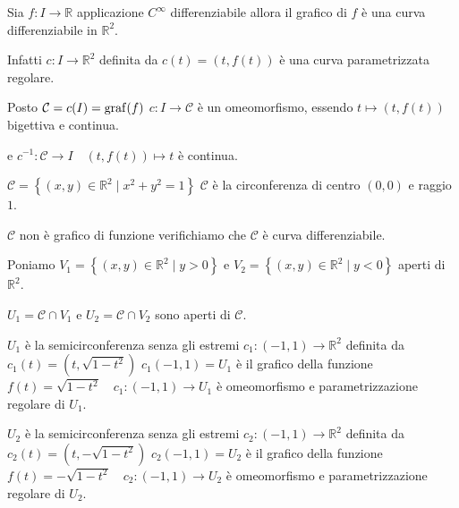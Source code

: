         \begin{esempio}
        Sia $f : I \to \mathbb{R}$ applicazione $C^\infty$ differenziabile allora il grafico di $f$ è una curva differenziabile in $\mathbb{R}^2$.

        Infatti $c:I \to \mathbb{R}^2$ definita da $c(t) = (t, f(t))$ è una curva parametrizzata regolare.

        Posto \textcolor{red}{$\mathcal{C}=c(I)=\operatorname{graf}(f)$} $c:I \to \mathcal{C}$ è un omeomorfismo, essendo $t \mapsto \left(t, f(t)\right)$ bigettiva e continua.

        e $c^{-1}: \mathcal{C} \to I \quad \left(t,f(t)\right) \mapsto t$ è continua.
        \end{esempio}
        \begin{esempio}
        $\mathcal{C}= \left\{(x,y) \in \mathbb{R}^2 \mid x^2 +y^2 =1 \right\}$ $\mathcal{C}$ è la circonferenza di centro $(0,0)$ e raggio $1$.

        $\mathcal{C}$ non è grafico di funzione verifichiamo che $\mathcal{C}$ è curva differenziabile.
        
        Poniamo $V_1 = \left\{(x,y) \in \mathbb{R}^2 \mid y > 0 \right\}$ e $V_2 = \left\{(x,y) \in \mathbb{R}^2 \mid y < 0 \right\}$ aperti di 
        $\mathbb{R}^2$. 

        $U_1 = \mathcal{C} \cap V_1$ e $U_2 = \mathcal{C} \cap V_2$ sono aperti di $\mathcal{C}$.

        $U_1$ è la semicirconferenza senza gli estremi $c_1: (-1,1) \to \mathbb{R}^2$ definita da $c_1(t) = (t, \sqrt{1-t^2})$
        $c_1(-1,1)=U_1$ è il grafico della funzione $f(t)=\sqrt{1-t^2} \quad c_1: (-1,1) \to U_1$ è omeomorfismo 
        e parametrizzazione regolare di $U_1$.

        $U_2$ è la semicirconferenza senza gli estremi $c_2: (-1,1) \to \mathbb{R}^2$ definita da $c_2(t) = (t, -\sqrt{1-t^2})$
        $c_2(-1,1)=U_2$ è il grafico della funzione $f(t)=-\sqrt{1-t^2} \quad c_2: (-1,1) \to U_2$ è omeomorfismo 
        e parametrizzazione regolare di $U_2$.
        \begin{center}
\end{center}
\end{esempio}
